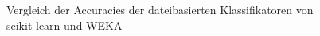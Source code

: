\begin{figure}
  \centering
  \caption{Vergleich der Accuracies der dateibasierten Klassifikatoren von scikit-learn und WEKA\label{fig:final-file}}
\end{figure}


